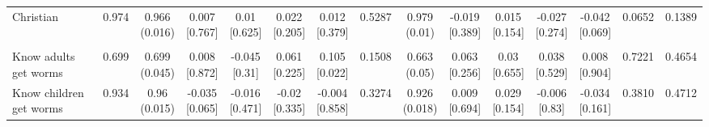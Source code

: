 \documentclass[
]{article}
\begin{document}
\begin{table}[htbp]
{\begin{tabular}[t]{lcccccccccccccc}
\hspace{1em}Christian & 0.974 & \makecell[c]{0.966\\(0.016)} & \makecell[c]{0.007\\{[0.767]}} & \makecell[c]{0.01\\{[0.625]}} & \makecell[c]{0.022\\{[0.205]}} & \makecell[c]{0.012\\{[0.379]}} & 0.5287 & \makecell[c]{0.979\\(0.01)} & \makecell[c]{-0.019\\{[0.389]}} & \makecell[c]{0.015\\{[0.154]}} & \makecell[c]{-0.027\\{[0.274]}} & \makecell[c]{-0.042\\{[0.069]}} & 0.0652 & 0.1389\\
\addlinespace[0.3em]
\hline
\multicolumn{15}{l}{\textit{\textbf{Panel C: Deworming knowledge, $N=1,995$}}}\\
\hline
\hspace{1em}Know adults get worms & 0.699 & \makecell[c]{0.699\\(0.045)} & \makecell[c]{0.008\\{[0.872]}} & \makecell[c]{-0.045\\{[0.31]}} & \makecell[c]{0.061\\{[0.225]}} & \makecell[c]{0.105\\{[0.022]}} & 0.1508 & \makecell[c]{0.663\\(0.05)} & \makecell[c]{0.063\\{[0.256]}} & \makecell[c]{0.03\\{[0.655]}} & \makecell[c]{0.038\\{[0.529]}} & \makecell[c]{0.008\\{[0.904]}} & 0.7221 & 0.4654\\
\hspace{1em}Know children get worms & 0.934 & \makecell[c]{0.96\\(0.015)} & \makecell[c]{-0.035\\{[0.065]}} & \makecell[c]{-0.016\\{[0.471]}} & \makecell[c]{-0.02\\{[0.335]}} & \makecell[c]{-0.004\\{[0.858]}} & 0.3274 & \makecell[c]{0.926\\(0.018)} & \makecell[c]{0.009\\{[0.694]}} & \makecell[c]{0.029\\{[0.154]}} & \makecell[c]{-0.006\\{[0.83]}} & \makecell[c]{-0.034\\{[0.161]}} & 0.3810 & 0.4712\\

\end{tabular}}
\end{table}
\end{document}
